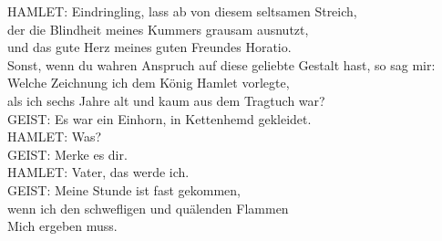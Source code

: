 \begin{playdialog}%
HAMLET: Eindringling, lass ab von diesem seltsamen Streich,\\
der die Blindheit meines Kummers grausam ausnutzt,\\
und das gute Herz meines guten Freundes Horatio.\\
Sonst, wenn du wahren Anspruch auf diese geliebte Gestalt hast, so sag mir:\\
Welche Zeichnung ich dem König Hamlet vorlegte,\\
als ich sechs Jahre alt und kaum aus dem Tragtuch war?\\

GEIST: Es war ein Einhorn, in Kettenhemd gekleidet.\\

HAMLET: Was?\\

GEIST: Merke es dir.\\

HAMLET: Vater, das werde ich.\\

GEIST: Meine Stunde ist fast gekommen,\\
wenn ich den schwefligen und quälenden Flammen\\
Mich ergeben muss.\\


\end{playdialog}

